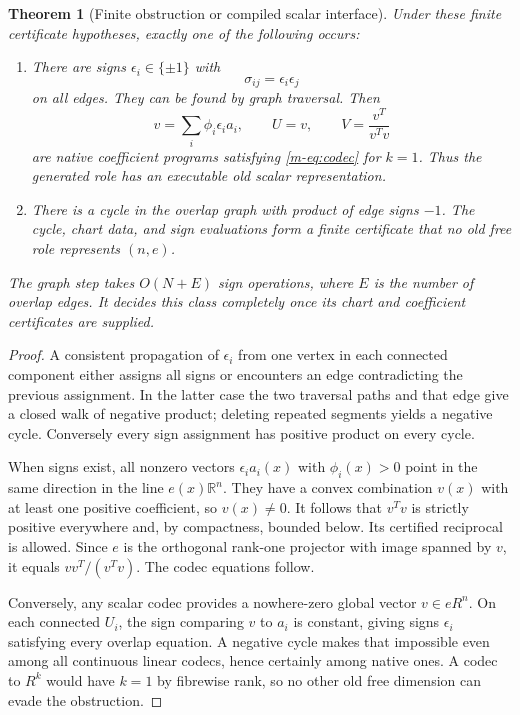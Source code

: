 \documentclass[11pt]{article}
\newtheorem{theorem}{Theorem}[section]
\theoremstyle{definition}
\theoremstyle{remark}
\newcommand{\R}{\mathbb R}
\begin{document}
\begin{theorem}[Finite obstruction or compiled scalar interface]\label{m-thm:sign}
Under these finite certificate hypotheses, exactly one of the following occurs:
\begin{enumerate}
\item There are signs $\epsilon_i\in\{\pm1\}$ with
\[
                       \sigma_{ij}=\epsilon_i\epsilon_j
\]
on all edges. They can be found by graph traversal. Then
\[
 v=\sum_i\phi_i\epsilon_i a_i,\qquad
 U=v,\qquad V=\frac{v^T}{v^Tv}
\]
are native coefficient programs satisfying \eqref{m-eq:codec} for $k=1$. Thus the generated role has an executable old scalar representation.
\item There is a cycle in the overlap graph with product of edge signs $-1$. The cycle, chart data, and sign evaluations form a finite certificate that no old free role represents $(n,e)$.
\end{enumerate}
The graph step takes $O(N+E)$ sign operations, where $E$ is the number of overlap edges. It decides this class completely once its chart and coefficient certificates are supplied.
\end{theorem}
\begin{proof}
A consistent propagation of $\epsilon_i$ from one vertex in each connected component either assigns all signs or encounters an edge contradicting the previous assignment. In the latter case the two traversal paths and that edge give a closed walk of negative product; deleting repeated segments yields a negative cycle. Conversely every sign assignment has positive product on every cycle.

When signs exist, all nonzero vectors $\epsilon_i a_i(x)$ with $\phi_i(x)>0$ point in the same direction in the line $e(x)\R^n$. They have a convex combination $v(x)$ with at least one positive coefficient, so $v(x)\ne0$. It follows that $v^Tv$ is strictly positive everywhere and, by compactness, bounded below. Its certified reciprocal is allowed. Since $e$ is the orthogonal rank-one projector with image spanned by $v$, it equals $vv^T/(v^Tv)$. The codec equations follow.

Conversely, any scalar codec provides a nowhere-zero global vector $v\in eR^n$. On each connected $U_i$, the sign comparing $v$ to $a_i$ is constant, giving signs $\epsilon_i$ satisfying every overlap equation. A negative cycle makes that impossible even among all continuous linear codecs, hence certainly among native ones. A codec to $R^k$ would have $k=1$ by fibrewise rank, so no other old free dimension can evade the obstruction.
\end{proof}
\end{document}
